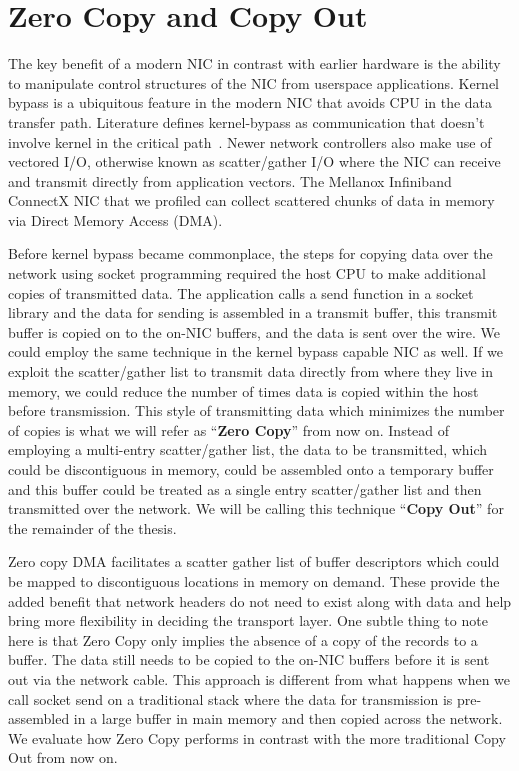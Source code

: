 \section{Zero Copy and Copy Out}
The key benefit of a modern NIC in contrast with earlier hardware is the ability to manipulate control structures of the NIC from userspace applications. 
Kernel bypass is a ubiquitous feature in the modern NIC that avoids CPU in the data transfer path.  Literature defines kernel-bypass as communication that doesn't 
involve kernel in the  critical path~\cite{unetkernelbypass}. Newer network controllers also make use of vectored I/O, otherwise known as scatter/gather I/O
where the NIC can receive and transmit directly from  application vectors. The Mellanox Infiniband ConnectX
NIC that we profiled can  collect scattered chunks of data in memory via Direct Memory Access (DMA).

Before kernel bypass became commonplace, the steps for copying data over the network using socket programming 
required the host CPU to make additional copies of transmitted data.
The application calls a send function in a socket library and the data for sending is assembled 
in a transmit buffer, this transmit buffer is copied on to the on-NIC buffers, and the data is 
sent over the wire. We could employ the same technique in the kernel bypass capable NIC as well.
If we exploit the scatter/gather list to transmit data directly from where they live in memory, 
we could reduce the number of times data is copied within the host before transmission. 
This style of transmitting data which minimizes the number of copies is what we will refer as \enquote{\textbf{Zero Copy}} from now on.
Instead of employing a multi-entry scatter/gather list, the data to be transmitted, which could be discontiguous in memory, could be assembled 
onto a temporary buffer and this buffer could be treated as a single entry scatter/gather list
and then transmitted over the network. We will be calling this technique \enquote{\textbf{Copy Out}} for the remainder of the thesis. 


Zero copy DMA facilitates a scatter gather list of buffer descriptors
which could be mapped to discontiguous locations in memory on demand. These provide
the added benefit that network headers do not need to exist along with data and help bring more flexibility 
in deciding the transport layer. One subtle thing to note here is that Zero Copy only implies the absence 
of a copy of the records to a buffer. The data still needs to be copied to the on-NIC buffers before 
it is sent out via the network cable. This approach is different from what happens when we call socket send on 
a traditional stack where the data for transmission is pre-assembled in a large buffer in main memory 
and then copied across the network. We evaluate how Zero Copy performs in contrast 
with the more traditional Copy Out from now on.

